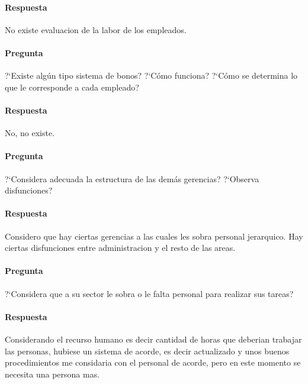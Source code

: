 \documentclass[12pt,a4paper,spanish]{article}
\begin{document}
	\paragraph{Respuesta}
No existe evaluacion de la labor de los empleados.

	\paragraph{Pregunta}
	 ?`Existe alg\'un tipo sistema de bonos?  ?`C\'omo funciona?  ?`C\'omo se determina lo que le corresponde a cada empleado?
	\paragraph{Respuesta}
No, no existe.

	\paragraph{Pregunta}
	 ?`Considera adecuada la estructura de las dem\'as gerencias?  ?`Observa disfunciones?
	\paragraph{Respuesta}
Considero que hay ciertas gerencias a las cuales les sobra personal jerarquico.
Hay ciertas disfunciones entre administracion y el resto de las areas.

	\paragraph{Pregunta}
	 ?`Considera que a su sector le sobra o le falta personal para realizar sus tareas?
	\paragraph{Respuesta}
	Considerando el recurso humano es decir cantidad de horas que deberian trabajar las personas, hubiese un sistema de acorde, es decir actualizado y unos buenos procedimientos me considaria con el personal de acorde, pero en este momento se necesita una persona mas.
\end{document}
